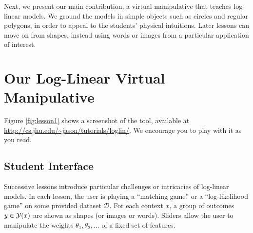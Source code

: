 \documentclass[11pt,letterpaper]{article}
\newcommand{\Note}[1]{}
\renewcommand{\Note}[1]{\hl{[#1]}}  %
\newcommand{\NoteSigned}[3]{{\sethlcolor{#2}\Note{#1: #3}}}
\newcommand{\NoteJE}[1]{\NoteSigned{JE}{LightGreen}{#1}}
\newcommand{\Commented}[1]{#1}
\newcommand{\Data}[0]{\ensuremath{\mathcal{D}}}
\newcommand{\WhereToFind}[0]{\url{http://cs.jhu.edu/~jason/tutorials/loglin/}}
\begin{document}
Next, we present our main contribution, a virtual manipulative that teaches log-linear models. We ground 
the models in simple objects such as circles and regular polygons, in order to appeal to the 
students' physical intuitions.  Later lessons can move on 
from shapes, instead using words or images from a particular
application of interest.


\section{Our Log-Linear Virtual Manipulative}\label{sec:overview}

Figure \ref{fig:lesson1} shows a screenshot
of the tool, available at 
\WhereToFind{}. We encourage you to play with it as you read.



\subsection{Student Interface}

Successive lessons introduce particular challenges or intricacies of
log-linear models.  In each lesson, the user is playing a ``matching
game'' or a ``log-likelihood game'' on some provided dataset \Data{}.
For each context $x$, a group of outcomes $y \in {\cal Y}(x)$ are
shown as shapes (or images or words).  Sliders allow the user to
manipulate the weights $\theta_1, \theta_2, \ldots$ of a fixed set of
features.  

\end{document}
